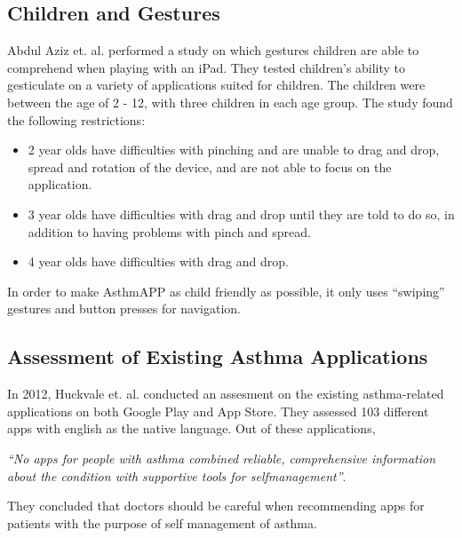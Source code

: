 \subsection{Children and Gestures}
\label{sec:childrenandgestures}
Abdul Aziz et. al.\cite{aziz2013children} performed a study on which gestures children are able to comprehend when playing with an iPad. They tested children's ability to gesticulate on a variety of applications suited for children. The children were between the age of 2 - 12, with three children in each age group. The study found the following restrictions:

\begin{itemize}
  \item 2 year olds have difficulties with pinching and are unable to drag and drop, spread and rotation of the device, and are not able to focus on the application. 
  \item 3 year olds have difficulties with drag and drop until they are told to do so, in addition to having problems with pinch and spread. 
  \item 4 year olds have difficulties with drag and drop. 
\end{itemize}

In order to make AsthmAPP as child friendly as possible, it only uses ``swiping'' gestures and button presses for navigation.


\subsection{Assessment of Existing Asthma Applications}
In 2012, Huckvale et. al.\cite{huckvale2012apps} conducted an assesment on the existing asthma-related applications on both Google Play and App Store. They assessed 103 different apps with english as the native language. Out of these applications, 

\emph{``No apps for people with asthma combined reliable, comprehensive information about the condition with supportive tools for self­management''}\cite{huckvale2012apps}. 

They concluded that doctors should be careful when recommending apps for patients with the purpose of self management of asthma.
